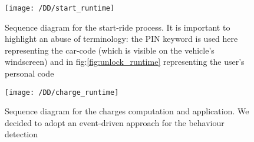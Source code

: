 \newpage
\begin{figure}[!ht]
  \centering
  \vspace{0.2cm}
  \texttt{[image: /DD/start\_runtime]}\\
  \vspace{0.4cm}
  \caption{Sequence diagram for the start-ride process. It is important to highlight an abuse of terminology: the PIN keyword is used here representing the car-code (which is visible on the vehicle's windscreen) and in fig:\ref{fig:unlock_runtime} representing the user's personal code}
  \label{fig:start_runtime} 
\end{figure}
\newpage
\begin{figure}[!ht]
  \centering
  \vspace{0.2cm}
  \texttt{[image: /DD/charge\_runtime]}\\
  \vspace{0.4cm}
  \caption{Sequence diagram for the charges computation and application. We decided to adopt an event-driven approach for the behaviour detection} 
  \label{fig:charge_runtime} 
\end{figure}
\newpage